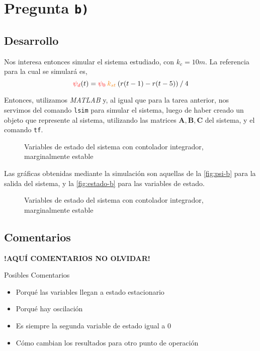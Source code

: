 \section{Pregunta \texttt{b)}}\label{pregunta-b}

\subsection{Desarrollo}

Nos interesa entonces simular el sistema estudiado, con $k_{c} = 10\unit{m}$.
La referencia para la cual se simulará es,
\begin{equation}
  \rojo{\psi_{d}}(t) = \rojo{\psi_{0}}\nara{k_{st}}\left(r(t-1) - r(t-5)\right) \mathbin{/} 4
  \label{eq:referencia}
\end{equation}

Entonces, utilizamos \textit{MATLAB} y, al igual que para la tarea anterior,
nos servimos del comando \verb|lsim| para simular el sistema, luego de haber
creado un objeto que represente al sistema, utilizando las matrices
$\mathbf{A}, \mathbf{B}, \mathbf{C}$ del sistema, y el comando \verb|tf|.

\begin{figure}[h]
  \centering
  
  \caption{Variables de estado del sistema con contolador integrador, marginalmente estable}
  \label{fig:psi-b}
\end{figure}

Las gráficas obtenidas mediante la simulación son aquellas de la \autoref{fig:psi-b} para
la salida del sistema, y la \autoref{fig:estado-b} para las variables de estado.

\begin{figure}[h]
  \centering
  
  \caption{Variables de estado del sistema con contolador integrador, marginalmente estable}
  \label{fig:estado-b}
\end{figure}

\FloatBarrier
\subsection{Comentarios}


\textbf{!AQUÍ COMENTARIOS NO OLVIDAR!}

Posibles Comentarios
\begin{itemize}
  \item Porqué las variables llegan a estado estacionario
  \item Porqué hay oscilación
  \item Es siempre la segunda variable de estado igual a 0
  \item Cómo cambian los resultados para otro punto de operación
\end{itemize}